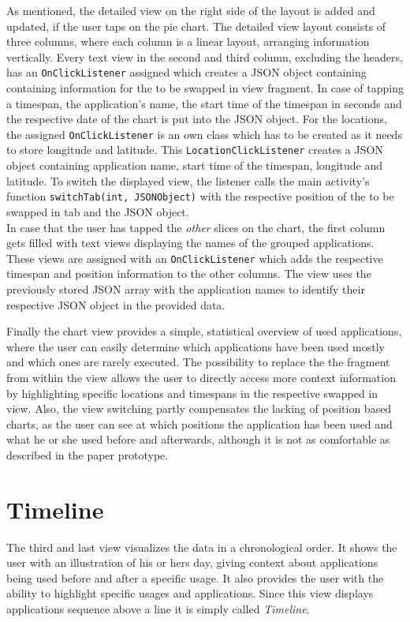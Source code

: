 As  mentioned, the detailed view on the right side of the layout is added and updated, if the user taps on the pie chart. The detailed view layout consists of three columns, where each column is a linear layout, arranging information vertically. Every text view in the second and third column, excluding the headers, has an \lstinline$OnClickListener$ assigned which creates a JSON object containing containing information for the to be swapped in view fragment. In case of tapping a timespan, the application's name, the start time of the timespan in seconds and the respective date of the chart is put into the JSON object. For the locations, the assigned \lstinline$OnClickListener$ is an own class which has to be created as it needs to store longitude and latitude. This \lstinline$LocationClickListener$ creates a JSON object containing application name, start time of the timespan, longitude and latitude. To switch the displayed view, the listener calls the main activity's function \lstinline$switchTab(int, JSONObject)$ with the respective position of the to be swapped in tab and the JSON object.\\
In case that the user has tapped the \emph{other} slices on the chart, the first column gets filled with text views displaying the names of the grouped applications. These views are assigned with an \lstinline$OnClickListener$ which adds the respective timespan and position information to the other columns. The view uses the previously stored JSON array with the application names to identify their respective JSON object in the provided data.

Finally the chart view provides a simple, statistical overview of used applications, where the user can easily determine which applications have been used mostly and which ones are rarely executed. The possibility to replace the the fragment from within the view allows the user to directly access more context information by highlighting specific locations and timespans in the respective swapped in view. Also, the view switching partly compensates the lacking of position based charts, as the user can see at which positions the application has been used and what he or she used before and afterwards, although it is not as comfortable as described in the paper prototype.

\section{Timeline}
The third and last view visualizes the data in a chronological order. It shows the user with an illustration of his or hers day, giving context about applications being used before and after a specific usage. It also provides the user with the ability to highlight specific usages and applications. Since this view displays applications sequence above a line it is simply called \emph{Timeline}.

